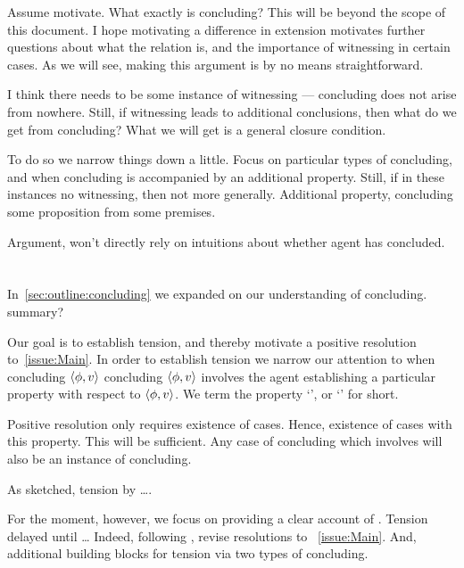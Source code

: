 \begin{note}
  Assume motivate.
  What exactly is concluding?
  This will be beyond the scope of this document.
  I hope motivating a difference in extension motivates further questions about what the relation is, and the importance of witnessing in certain cases.
  As we will see, making this argument is by no means straightforward.

  I think there needs to be some instance of witnessing --- concluding does not arise from nowhere.
  Still, if witnessing leads to additional conclusions, then what do we get from concluding?
  What we will get is a general closure condition.

  To do so we narrow things down a little.
  Focus on particular types of concluding, and when concluding is accompanied by an additional property.
  Still, if in these instances no witnessing, then not more generally.
  Additional property, concluding some proposition from some premises.

  Argument, won't directly rely on intuitions about whether agent has concluded.
\end{note}



\section{}
\label{sec:overview:zS}

\begin{note}
  \begin{quote}
    \issueMain*
  \end{quote}
  In~\autoref{sec:outline:concluding} we expanded on our understanding of concluding.
  {
    \color{red} summary?
  }

  Our goal is to establish tension, and thereby motivate a positive resolution to~\autoref{issue:Main}.
  In order to establish tension we narrow our attention to when concluding \(\langle \phi, v \rangle\) concluding \(\langle \phi, v \rangle\) involves the agent establishing a particular property with respect to \(\langle \phi, v \rangle\).
  We term the property `', or `\zS{}' for short.

  Positive resolution only requires existence of cases.
  Hence, existence of cases with this property.
  This will be sufficient.
  Any case of concluding which involves \csVImp{} will also be an instance of concluding.

  As sketched, tension by {\color{red} \dots}.

  For the moment, however, we focus on providing a clear account of \csN{}.
  Tension delayed until \dots
  Indeed, following \csN{}, revise resolutions to ~\autoref{issue:Main}.
  And, additional building blocks for tension via two types of concluding.
\end{note}

